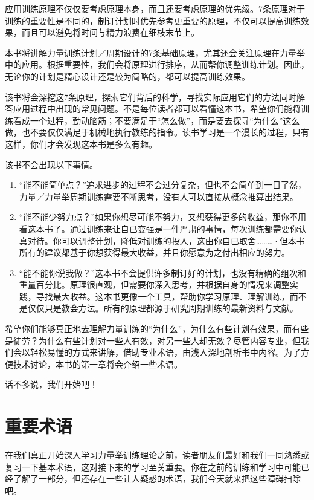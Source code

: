 \documentclass[fontset=fandol, a4paper, 12pt, openright]{ctexbook}
\begin{document}
应用训练原理不仅仅要考虑原理本身，而且还要考虑原理的优先级。7条原理对于训练的重要性是不同的，制订计划时优先参考更重要的原理，不仅可以提高训练效果，而且可以避免将时间与精力浪费在细枝末节上。

本书将讲解力量训练计划／周期设计的7条基础原理，尤其还会关注原理在力量举中的应用。根据重要性，我们会将原理进行排序，从而帮你调整训练计划。因此，无论你的计划是精心设计还是较为简略的，都可以提高训练效果。

该书将会深挖这7条原理，探索它们背后的科学，寻找实际应用它们的方法同时解答应用过程中出现的常见问题。不是每位读者都可以看懂这本书，希望你们能将训练看成一个过程，勤动脑筋；不要满足于“怎么做”，而是要去探寻“为什么”这么做，也不要仅仅满足于机械地执行教练的指令。读书学习是一个漫长的过程，只有这样，你们才会发现这本书是多么有趣。

该书不会出现以下事情。
\begin{enumerate}
    \item “能不能简单点？”追求进步的过程不会过分复杂，但也不会简单到一目了然，力量／力量举周期训练需要不断思考，没有人可以直接从概念推算出结果。
    \item “能不能少努力点？”如果你想尽可能不努力，又想获得更多的收益，那你不用看这本书了。通过训练来让自已变强是一件严肃的事情，每次训练都需要你认真对待。你可以调整计划，降低对训练的投人，这由你自已取舍………·但本书所有的建议都基于你想获得最大收益，并且你愿意为之付出相应的努力。
    \item “能不能你说我做？”这本书不会提供许多制订好的计划，也没有精确的组次和重量百分比。原理很直观，但需要你深入思考，并根据自身的情况来调整实践，寻找最大收益。这本书更像一个工具，帮助你学习原理、理解训练，而不是仅仅只是教会方法。所有的原理都源于研究周期训练的最新资料与文献。
\end{enumerate}

希望你们能够真正地去理解力量训练的“为什么”，为什么有些计划有效果，而有些是徒劳？为什么有些计划对一些人有效，对另一些人却无效？尽管内容专业，但我们会以轻松易懂的方式来讲解，借助专业术语，由浅人深地剖析书中内容。为了方便技术讨论，本书的第一章将会介绍一些术语。

话不多说，我们开始吧！


\tableofcontents

\mainmatter

\chapter{重要术语}
在我们真正开始深入学习力量举训练理论之前，读者朋友们最好和我们一同熟悉或复习一下基本术语，这对接下来的学习至关重要。你在之前的训练和学习中可能已经了解了一部分，但还存在一些让人疑惑的术语，我们今天就来把这些障碍扫除吧。
\end{document}
